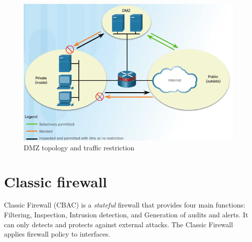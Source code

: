 \begin{figure}[hbtp]
\caption{DMZ topology and traffic restriction}\label{DMZfilter}
\centering
\includegraphics[width=10\xm]{pictures/DMZfilter.PNG}
\end{figure}

%
%

\section{Classic firewall}\label{sec:ClassicFirewall}

Classic Firewall (CBAC) is a \emph{stateful} firewall that provides four main functions: Filtering, Inspection, Intrusion detection, and Generation of audits and alerts. It can only detects and protects against external attacks. The Classic Firewall applies firewall policy to interfaces.\\ 

